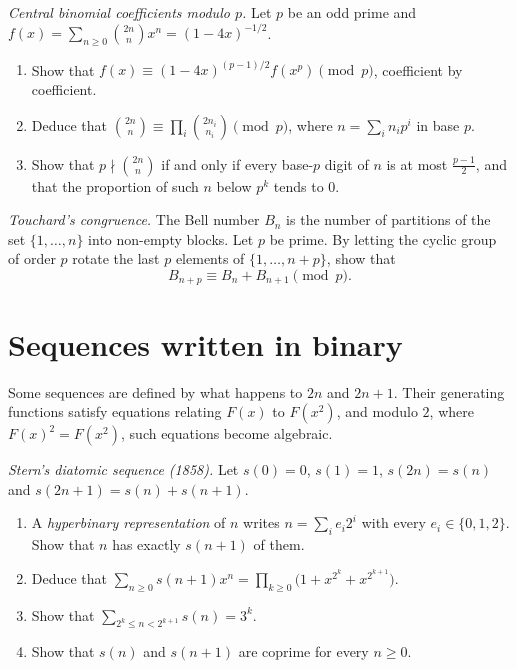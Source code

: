 \begin{exercise}[$\star\star$]\label{pb:centralp}
\emph{Central binomial coefficients modulo $p$.} Let $p$ be an odd prime and $f(x)=\sum_{n\ge0}\binom{2n}nx^n=(1-4x)^{-1/2}$.
\begin{enumerate}[label=(\alph*)]
\item Show that $f(x)\equiv(1-4x)^{(p-1)/2}f(x^p)\pmod p$, coefficient by coefficient.
\item Deduce that $\binom{2n}n\equiv\prod_i\binom{2n_i}{n_i}\pmod p$, where $n=\sum_in_ip^i$ in base $p$.
\item Show that $p\nmid\binom{2n}n$ if and only if every base-$p$ digit of $n$ is at most $\frac{p-1}2$, and that the proportion of
such $n$ below $p^k$ tends to $0$.
\end{enumerate}
\end{exercise}

\begin{exercise}[$\star\star$]\label{pb:touchard}
\emph{Touchard's congruence.} The Bell number $B_n$ is the number of partitions of the set $\{1,\dots,n\}$ into non-empty blocks.
Let $p$ be prime. By letting the cyclic group of order $p$ rotate the last $p$ elements of $\{1,\dots,n+p\}$, show that
\[
B_{n+p}\equiv B_n+B_{n+1}\pmod p.
\]
\end{exercise}

\section{Sequences written in binary}

Some sequences are defined by what happens to $2n$ and $2n+1$. Their generating functions satisfy equations relating $F(x)$ to
$F(x^2)$, and modulo $2$, where $F(x)^2=F(x^2)$, such equations become algebraic.

\begin{exercise}[$\star\star$]\label{pb:stern}
\emph{Stern's diatomic sequence (1858).} Let $s(0)=0$, $s(1)=1$, $s(2n)=s(n)$ and $s(2n+1)=s(n)+s(n+1)$.
\begin{enumerate}[label=(\alph*)]
\item A \emph{hyperbinary representation} of $n$ writes $n=\sum_ie_i2^i$ with every $e_i\in\{0,1,2\}$. Show that $n$ has exactly
$s(n+1)$ of them.
\item Deduce that $\sum_{n\ge0}s(n+1)x^n=\prod_{k\ge0}\bigl(1+x^{2^k}+x^{2^{k+1}}\bigr)$.
\item Show that $\sum_{2^k\le n<2^{k+1}}s(n)=3^k$.
\item Show that $s(n)$ and $s(n+1)$ are coprime for every $n\ge0$.
\end{enumerate}
\end{exercise}

